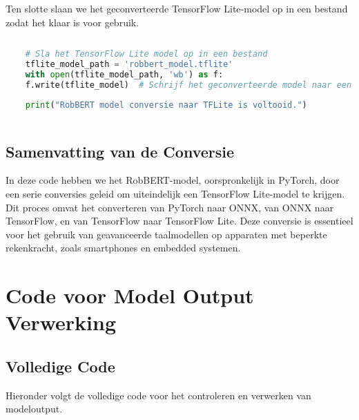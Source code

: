 Ten slotte slaan we het geconverteerde TensorFlow Lite-model op in een bestand zodat het klaar is voor gebruik.

\begin{lstlisting}[language=Python, caption={Opslaan van het geconverteerde TensorFlow Lite-model.}]
    
    # Sla het TensorFlow Lite model op in een bestand
    tflite_model_path = 'robbert_model.tflite'
    with open(tflite_model_path, 'wb') as f:
    f.write(tflite_model)  # Schrijf het geconverteerde model naar een bestand
    
    print("RobBERT model conversie naar TFLite is voltooid.")
    
\end{lstlisting}

\subsection{Samenvatting van de Conversie}

In deze code hebben we het RobBERT-model, oorspronkelijk in PyTorch, door een serie conversies geleid om uiteindelijk een TensorFlow Lite-model te krijgen. Dit proces omvat het converteren van PyTorch naar ONNX, van ONNX naar TensorFlow, en van TensorFlow naar TensorFlow Lite. Deze conversie is essentieel voor het gebruik van geavanceerde taalmodellen op apparaten met beperkte rekenkracht, zoals smartphones en embedded systemen.

\section{Code voor Model Output Verwerking}

\subsection{Volledige Code}

Hieronder volgt de volledige code voor het controleren en verwerken van modeloutput.

